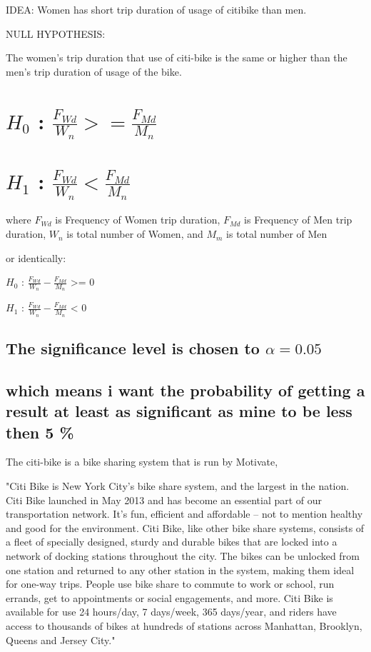 IDEA:
Women has short trip duration of usage of citibike than men.

NULL HYPOTHESIS:

The women's trip duration that use of citi-bike is the same or higher than the men's trip duration of usage of the bike.

\section{$H_0$ : $\frac{F_{Wd}}{W_{n}} >= \frac{F_{Md}}{M_{n}} $ }



\section{$H_1$ : $\frac{F_{Wd}}{W_{n}} < \frac{F_{Md}}{M_{n}} $}

where $F_{Wd}$ is Frequency of Women trip duration, $F_{Md}$ is Frequency of Men trip duration, ${W_{n}}$ is total number of Women, and ${M_{m}}$ is total number of Men

or identically:

$H_0$ : $\frac{F_{Wd}}{W_{n}} - \frac{F_{Md}}{M_{n}} $ >= 0

$H_1$ : $\frac{F_{Wd}}{W_{n}} - \frac{F_{Md}}{M_{n}} $ < 0

\subsection{The significance level is chosen to $\alpha=0.05$}

\subsection{which means i want the probability of getting a result at least as significant as mine to be less then 5 \%}


The citi-bike is a bike sharing system that is run by Motivate,

"Citi Bike is New York City’s bike share system, and the largest in the nation. Citi Bike launched in May 2013 and has become an essential part of our transportation network. It's fun, efficient and affordable – not to mention healthy and good for the environment.
Citi Bike, like other bike share systems, consists of a fleet of specially designed, sturdy and durable bikes that are locked into a network of docking stations throughout the city. The bikes can be unlocked from one station and returned to any other station in the system, making them ideal for one-way trips. People use bike share to commute to work or school, run errands, get to appointments or social engagements, and more.
Citi Bike is available for use 24 hours/day, 7 days/week, 365 days/year, and riders have access to thousands of bikes at hundreds of stations across Manhattan, Brooklyn, Queens and Jersey City." 